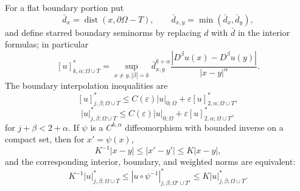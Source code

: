 For a flat boundary portion put
\[
\bar d_x=\operatorname{dist}(x,\partial\Omega-T),\qquad
\bar d_{x,y}=\min(\bar d_x,\bar d_y),
\]
and define starred boundary seminorms by replacing $d$ with $\bar d$ in the
interior formulas; in particular
\[
[u]^*_{k,\alpha;\Omega\cup T}=
\sup_{x\ne y,|\beta|=k}\bar d_{x,y}^{k+\alpha}
\frac{|D^\beta u(x)-D^\beta u(y)|}{|x-y|^\alpha}.
\]
The boundary interpolation inequalities are
\begin{equation}
\tag{6.24}
[u]^*_{j,\beta;\Omega\cup T}
\leq C(\varepsilon)|u|_{0;\Omega}
+\varepsilon[u]^*_{2,\alpha;\Omega\cup T},
\end{equation}
\begin{equation}
\tag{6.25}
|u|^*_{j,\beta;\Omega\cup T}
\leq C(\varepsilon)|u|_{0;\Omega}
+\varepsilon[u]^*_{2,\alpha;\Omega\cup T},
\end{equation}
for $j+\beta<2+\alpha$.
If $\psi$ is a $C^{k,\alpha}$ diffeomorphism with bounded inverse on a compact
set, then for $x'=\psi(x)$,
\begin{equation}\tag{6.29}
K^{-1}|x-y|\le|x'-y'|\le K|x-y|,
\end{equation}
and the corresponding interior, boundary, and weighted norms are equivalent:
\begin{equation}\tag{6.30}
K^{-1}|u|^*_{j,\beta;\Omega\cup T}
\le|u\circ\psi^{-1}|^*_{j,\beta;\Omega'\cup T'}
\le K|u|^*_{j,\beta;\Omega\cup T}.
\end{equation}

